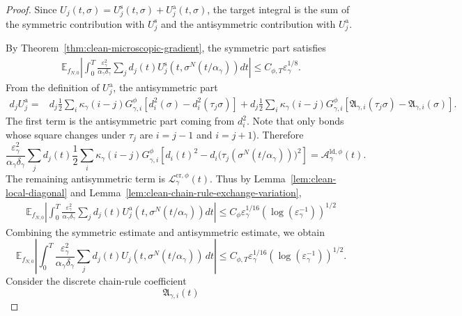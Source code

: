 \documentclass{article}
\begin{document}
\begin{proof}
Since $U_j(t,\sigma) = U_j^{\mathrm s}(t,\sigma)+U_j^{\mathrm a}(t,\sigma)$, the target integral is the sum of the symmetric contribution with
\(U_j^{\mathrm s}\) and the antisymmetric contribution with \(U_j^{\mathrm a}\).

By Theorem~\ref{thm:clean-microscopic-gradient}, the symmetric part satisfies
\begin{align}
   \mathbb E_{f_{N,0}}
\left| \int_0^T \frac{\varepsilon_\gamma^2}{\alpha_\gamma\delta_\gamma}
\sum_jd_j(t)U_j^{\mathrm s}(t,\sigma^N(t/\alpha_\gamma))dt
\right| \le C_{\phi,T}\varepsilon_\gamma^{1/8}.
\end{align}
From the definition of \(U_j^{\mathrm a}\), the antisymmetric part
\[
\begin{aligned}
d_jU_j^{\mathrm a}
={}&
d_j\frac12\sum_i\kappa_\gamma(i-j)G_{\gamma,i}^{\phi}
\left[d_i^2(\sigma)-d_i^2(\tau_j\sigma)\right]
+
d_j\frac12\sum_i\kappa_\gamma(i-j)G_{\gamma,i}^{\phi}
\left[
\mathfrak A_{\gamma,i}(\tau_j\sigma)-\mathfrak A_{\gamma,i}(\sigma)
\right].
\end{aligned}
\]
The first term is the antisymmetric part coming from \(d_i^2\).
Note that only bonds whose square changes under \(\tau_j\) are
\(i=j-1\) and \(i=j+1\)). Therefore
\begin{equation}
    \frac{\varepsilon_\gamma^2}{\alpha_\gamma\delta_\gamma}
\sum_jd_j(t)
\frac12 \sum_i\kappa_\gamma(i-j)G_{\gamma,i}^{\phi}
\left[
d_i(t)^2-d_i\bigl(\tau_j(\sigma^N(t/\alpha_\gamma))\bigr)^2
\right] = \mathscr A_{\gamma}^{\mathrm{ld},\phi}(t) .
\end{equation}
The remaining antisymmetric term is $\mathscr L_{\gamma}^{\mathrm{cr},\phi}(t)$.
Thus by Lemma~\ref{lem:clean-local-diagonal} and  Lemma~\ref{lem:clean-chain-rule-exchange-variation}, 
\begin{align}
     \mathbb E_{f_{N,0}} \left| \int_0^T \frac{\varepsilon_\gamma^2}{\alpha_\gamma\delta_\gamma} \sum_jd_j(t)U^{\mathrm a}_j(t,\sigma^N(t/\alpha_\gamma))dt \right| \le  C_\phi \varepsilon^{1/16}_{\gamma}\left(\log(\varepsilon^{-1}_{\gamma})\right)^{1/2}
\end{align}
Combining the symmetric estimate and antisymmetric estimate, we obtain 
\[
\mathbb E_{f_{N,0}}
\left|
\int_0^T
\frac{\varepsilon_\gamma^2}{\alpha_\gamma\delta_\gamma}
\sum_j d_j(t)U_j(t,\sigma^N(t/\alpha_\gamma))\,dt
\right| \le C_{\phi,T} \varepsilon^{1/16}_{\gamma}\left(\log(\varepsilon^{-1}_{\gamma})\right)^{1/2}.
\]
Consider the discrete chain-rule coefficient
\[
\mathfrak A_{\gamma,i}(t)
\]
\end{proof}
\end{document}
